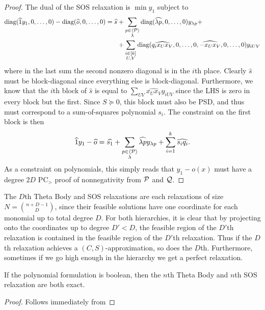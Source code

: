 \begin{proof}
The dual of the SOS relaxation is $\min y_1$ subject to
\begin{align*}
\text{diag}(\widehat{1}y_1,0,\dots,0) - \text{diag}(\widehat{o},0,\dots,0) = \widehat{s} &+ \sum_{\substack{p \in \langle \mathcal P \rangle \\ \lambda}} \text{diag}(\widehat{\lambda p},0,\dots,0) y_{\lambda p} +\\
&+ \sum_{\substack{i \in [k] \\ U,V}} \text{diag}(\widehat{q_ix_Ux_V},0,\dots,0,\widehat{-x_Ux_V},0,\dots,0)y_{iUV}
\end{align*}
where in the last sum the second nonzero diagonal is in the $i$th place. Clearly $\widehat{s}$ must be block-diagonal since everything else is block-diagonal. Furthermore, we know that the $i$th block of $\widehat{s}$ is equal to $\sum_{UV} \widehat{x_Ux_V}y_{iUV}$ since the LHS is zero in every block but the first. Since $S \succeq 0$, this block must also be PSD, and thus must correspond to a sum-of-squares polynomial $s_i$. The constraint on the first block is then 
\[\widehat{1}y_1 - \widehat{o} = \widehat{s_1} + \sum_{\substack{p \in \langle \mathcal P \rangle \\ \lambda}} \widehat{\lambda p} y_{\lambda p} + \sum_{i=1}^k \widehat{s_i q_i}.\] 
As a constraint on polynomials, this simply reads that $y_1 - o(x)$ must have a degree $2D$ PC$_>$ proof of nonnegativity from $\mathcal P$ and $\mathcal Q$. 
\end{proof}

The $D$th Theta Body and SOS relaxations are each relaxations of size $N = \binom{n+D-1}{D}$, since their feasible solutions have one coordinate for each monomial up to total degree $D$. For both hierarchies, it is clear that by projecting onto the coordinates up to degree $D' < D$, the feasible region of the $D'$th relaxation is contained in the feasible region of the $D'$th relaxation. Thus if the $D$th relaxation achieves a $(C,S)$-approximation, so does the $D$th. Furthermore, sometimes if we go high enough in the hierarchy we get a perfect relaxation.
\begin{lemma}
If the polynomial formulation is boolean, then the $n$th Theta Body and $n$th SOS relaxation are both exact. 
\end{lemma}
\begin{proof}
Follows immediately from 
\end{proof}

